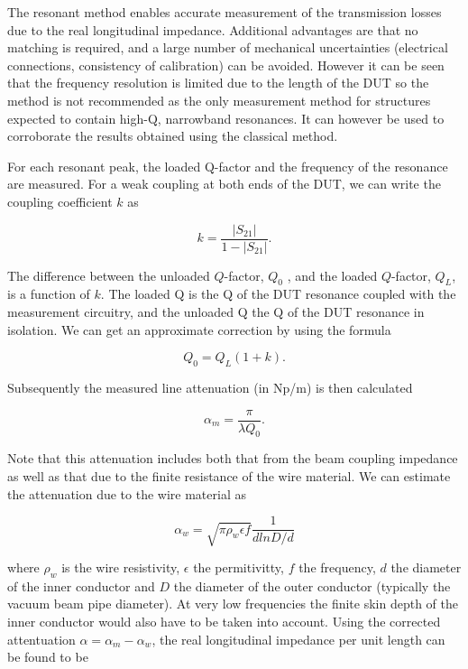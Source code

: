 The resonant method enables accurate measurement of the transmission losses due to the real longitudinal impedance. Additional advantages are that no matching is required, and a large number of mechanical uncertainties (electrical connections, consistency of calibration) can be avoided. However it can be seen that the frequency resolution is limited due to the length of the DUT so the method is not recommended as the only measurement method for structures expected to contain high-Q, narrowband resonances. It can however be used to corroborate the results obtained using the classical method.

For each resonant peak, the loaded Q-factor and the frequency of the resonance are measured. For a weak coupling at both ends of the DUT, we can write the coupling coefficient $k$ as

\begin{equation}
k = \frac{\left| S_{21} \right|}{1 - \left| S_{21} \right| }.
\label{eqn:coupling_coeff}
\end{equation}

The difference between the unloaded $Q$-factor, $Q_{0}$ , and the loaded $Q$-factor, $Q_{L}$, is a function of $k$. The loaded Q is the Q of the DUT resonance coupled with the measurement circuitry, and the unloaded Q the Q of the DUT resonance in isolation. We can get an approximate correction by using the formula

\begin{equation}
Q_{0} = Q_{L} \left( 1 + k  \right).
\label{eqn:Q_correc}
\end{equation}

Subsequently the measured line attenuation (in Np/m) is then calculated

\begin{equation}
\alpha_{m} = \frac{\pi}{\lambda Q_{0}}.
\label{eqn:atten}
\end{equation}

Note that this attenuation includes both that from the beam coupling impedance as well as that due to the finite resistance of the wire material. We can estimate the attenuation due to the wire material as

\begin{equation}
\alpha_{w} = \sqrt{\pi \rho_{w} \epsilon f} \frac{1}{d ln D/d}
\label{eqn:wire_atten}
\end{equation}

where $\rho_{w}$ is the wire resistivity, $\epsilon$ the permitivitty, $f$ the frequency, $d$ the diameter of the inner conductor and $D$ the diameter of the outer conductor (typically the vacuum beam pipe diameter). At very low frequencies the finite skin depth of the inner conductor would also have to be taken into account. Using the corrected attentuation $\alpha = \alpha_{m} - \alpha_{w}$, the real longitudinal impedance per unit length can be found to be 

